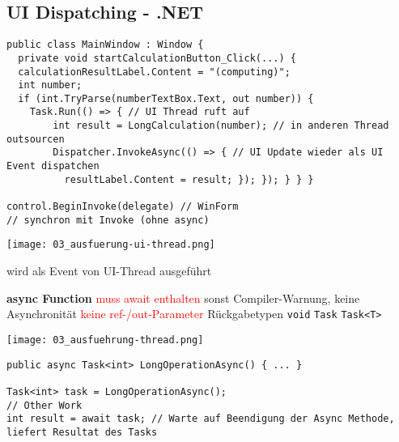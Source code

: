 \subsection{UI Dispatching - .NET}

\begin{lstlisting}
public class MainWindow : Window {
  private void startCalculationButton_Click(...) {
  calculationResultLabel.Content = "(computing)";
  int number;
  if (int.TryParse(numberTextBox.Text, out number)) {
    Task.Run(() => { // UI Thread ruft auf
    	int result = LongCalculation(number); // in anderen Thread outsourcen
    	Dispatcher.InvokeAsync(() => { // UI Update wieder als UI Event dispatchen
    	  resultLabel.Content = result; }); }); } } }

control.BeginInvoke(delegate) // WinForm
// synchron mit Invoke (ohne async)
\end{lstlisting}

\texttt{[image: 03\_ausfuerung-ui-thread.png]}

wird als Event von UI-Thread ausgeführt


\textbf{async Function} \textcolor{red}{muss await enthalten} sonst Compiler-Warnung, keine Asynchronität \textcolor{red}{keine ref-/out-Parameter} Rückgabetypen \lstinline{void} \lstinline{Task} \lstinline{Task<T>}

\texttt{[image: 03\_ausfuehrung-thread.png]}


\begin{lstlisting}
public async Task<int> LongOperationAsync() { ... }

Task<int> task = LongOperationAsync();
// Other Work
int result = await task; // Warte auf Beendigung der Async Methode, liefert Resultat des Tasks
\end{lstlisting}
